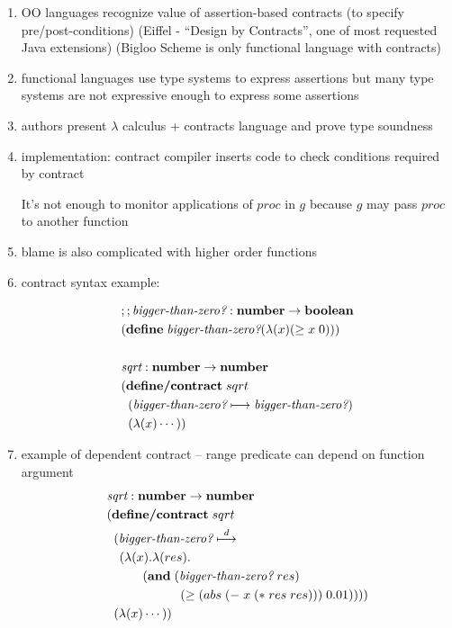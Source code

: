 \documentclass[12pt]{article}	%
\newcommand{\keyw}[1]{ \ensuremath{ \textbf{#1} } }
\newcommand{\num}{ \keyw{number} }
\newcommand{\bool}{ \keyw{boolean} }
\newcommand{\numnum}{ \ensuremath{ \num\rightarrow\num } }
\newcommand{\numbool}{ \ensuremath{ \num\rightarrow\bool } }
\newcommand{\define}{ \keyw{define} }
\newcommand{\defcontract}{ \keyw{define/contract} }
\newcommand{\contract}{ \ensuremath{ \longmapsto } }
\newcommand{\dcontract}{ \ensuremath{ \stackrel{d}{\longmapsto} } }
\begin{document}
\begin{enumerate}
	\item OO languages recognize value of assertion-based contracts (to specify pre/post-conditions) (Eiffel - ``Design by Contracts'', one of most requested Java extensions) (Bigloo Scheme is only functional language with contracts)
	\item functional languages use type systems to express assertions but many type systems are not expressive enough to express some assertions
	\item authors present $\lambda$ calculus + contracts language and prove type soundness
	\item implementation: contract compiler inserts code to check conditions required by contract

	It's not enough to monitor applications of $proc$ in $g$ because $g$ may pass $proc$ to another function
	\item blame is also complicated with higher order functions
	\item contract syntax example:
	

\begin{align*}
& ;; \biggerthanzero : \numbool \\
& (\define \; \biggerthanzero (\lambda (x) (\geq x \; 0))) \\
& \\
& \textit{sqrt} : \numnum \\
& (\defcontract \; sqrt \\
& \;\;(\biggerthanzero \contract \biggerthanzero) \\
& \;\;(\lambda (x) \cdots))
\end{align*}


	\item example of dependent contract -- range predicate can depend on function argument
\begin{align*}
& \textit{sqrt} : \numnum \\
& (\defcontract \; sqrt \\
& \;\;(\biggerthanzero \dcontract \\
& \;\;\;\,(\lambda(x).\lambda(res). \\
& \hspace{10mm}(\keyw{and} \; (\biggerthanzero \; res) \\
& \hspace{20.5mm}               (\geq (abs \; (- \; x \; (* \; res \; res))) \; 0.01)))) \\
& \;\;(\lambda (x) \cdots))
\end{align*}
	

\end{enumerate}
\end{document}
